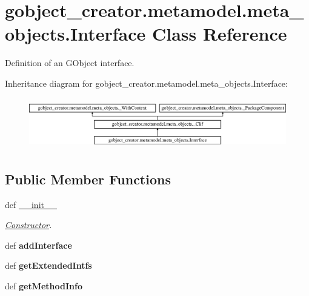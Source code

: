 \hypertarget{classgobject__creator_1_1metamodel_1_1meta__objects_1_1Interface}{
\section{gobject\_\-creator.metamodel.meta\_\-objects.Interface Class Reference}
\label{classgobject__creator_1_1metamodel_1_1meta__objects_1_1Interface}
}


Definition of an GObject interface.  


Inheritance diagram for gobject\_\-creator.metamodel.meta\_\-objects.Interface:\begin{figure}[H]
\begin{center}
\leavevmode
\includegraphics[height=2.25806cm]{classgobject__creator_1_1metamodel_1_1meta__objects_1_1Interface}
\end{center}
\end{figure}
\subsection*{Public Member Functions}
\begin{DoxyCompactItemize}
\item 
def \hyperlink{classgobject__creator_1_1metamodel_1_1meta__objects_1_1Interface_a3211fc395bb2b5436b9a89d4dcb097d8}{\_\-\_\-init\_\-\_\-}
\begin{DoxyCompactList}\small\item\em \hyperlink{classgobject__creator_1_1metamodel_1_1meta__objects_1_1Constructor}{Constructor}. \item\end{DoxyCompactList}\item 
\hypertarget{classgobject__creator_1_1metamodel_1_1meta__objects_1_1Interface_abfffc8964e703fb8ee6e5deac33709d8}{
def {\bfseries addInterface}}
\label{classgobject__creator_1_1metamodel_1_1meta__objects_1_1Interface_abfffc8964e703fb8ee6e5deac33709d8}

\item 
\hypertarget{classgobject__creator_1_1metamodel_1_1meta__objects_1_1Interface_a4b0bd03f28a09b0c3af28da9ea4eb58d}{
def {\bfseries getExtendedIntfs}}
\label{classgobject__creator_1_1metamodel_1_1meta__objects_1_1Interface_a4b0bd03f28a09b0c3af28da9ea4eb58d}

\item 
\hypertarget{classgobject__creator_1_1metamodel_1_1meta__objects_1_1Interface_a9d61b099e9eabb16b022aae3eccca063}{
def {\bfseries getMethodInfo}}
\label{classgobject__creator_1_1metamodel_1_1meta__objects_1_1Interface_a9d61b099e9eabb16b022aae3eccca063}

\end{DoxyCompactItemize}



